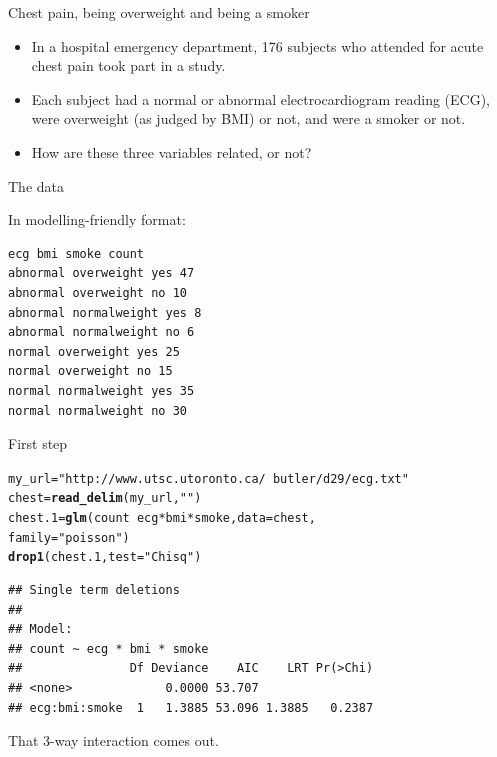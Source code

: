 \documentclass[unknownkeysallowed]{beamer}\usepackage[]{graphicx}\usepackage[]{color}
\makeatletter
\newcommand{\hlstr}[1]{\textcolor[rgb]{0.192,0.494,0.8}{#1}}%
\newcommand{\hlopt}[1]{\textcolor[rgb]{0,0,0}{#1}}%
\newcommand{\hlstd}[1]{\textcolor[rgb]{0.345,0.345,0.345}{#1}}%
\newcommand{\hlkwb}[1]{\textcolor[rgb]{0.69,0.353,0.396}{#1}}%
\newcommand{\hlkwc}[1]{\textcolor[rgb]{0.333,0.667,0.333}{#1}}%
\newcommand{\hlkwd}[1]{\textcolor[rgb]{0.737,0.353,0.396}{\textbf{#1}}}%
\newenvironment{kframe}{%
 \def\at@end@of@kframe{}%
 \ifinner\ifhmode%
  \def\at@end@of@kframe{\end{minipage}}%
  \begin{minipage}{\columnwidth}%
 \fi\fi%
 \def\FrameCommand##1{\hskip\@totalleftmargin \hskip-\fboxsep
 \colorbox{shadecolor}{##1}\hskip-\fboxsep
     \hskip-\linewidth \hskip-\@totalleftmargin \hskip\columnwidth}%
 \MakeFramed {\advance\hsize-\width
   \@totalleftmargin\z@ \linewidth\hsize
   \@setminipage}}%
 {\par\unskip\endMakeFramed%
 \at@end@of@kframe}
\newenvironment{knitrout}{}{} %
\makeatother
\begin{document}
\begin{frame}[fragile]{Chest pain, being overweight and being a smoker}
  
  \begin{itemize}
  \item In a hospital emergency department, 176 subjects who attended
    for acute chest pain took part in a study.
  \item Each subject had a
    normal or abnormal electrocardiogram reading (ECG), were
    overweight (as judged by BMI) or not, and were a smoker or
    not.
  \item How are these three variables related, or not?
  \end{itemize}
  
\end{frame}

\begin{frame}[fragile]{The data}
  
  In modelling-friendly format:
  
\begin{verbatim}
ecg bmi smoke count
abnormal overweight yes 47
abnormal overweight no 10
abnormal normalweight yes 8 
abnormal normalweight no 6
normal overweight yes 25 
normal overweight no 15 
normal normalweight yes 35
normal normalweight no 30
\end{verbatim}
  
\end{frame}

\begin{frame}[fragile]{First step}
  
\begin{knitrout}\small
{}\color{fgcolor}\begin{kframe}
\begin{alltt}
\hlstd{my_url}\hlkwb{=}\hlstr{"http://www.utsc.utoronto.ca/~butler/d29/ecg.txt"}
\hlstd{chest}\hlkwb{=}\hlkwd{read_delim}\hlstd{(my_url,}\hlstr{" "}\hlstd{)}
\hlstd{chest.1}\hlkwb{=}\hlkwd{glm}\hlstd{(count}\hlopt{~}\hlstd{ecg}\hlopt{*}\hlstd{bmi}\hlopt{*}\hlstd{smoke,}\hlkwc{data}\hlstd{=chest,}
            \hlkwc{family}\hlstd{=}\hlstr{"poisson"}\hlstd{)}
\hlkwd{drop1}\hlstd{(chest.1,}\hlkwc{test}\hlstd{=}\hlstr{"Chisq"}\hlstd{)}
\end{alltt}
\begin{verbatim}
## Single term deletions
## 
## Model:
## count ~ ecg * bmi * smoke
##               Df Deviance    AIC    LRT Pr(>Chi)
## <none>             0.0000 53.707                
## ecg:bmi:smoke  1   1.3885 53.096 1.3885   0.2387
\end{verbatim}
\end{kframe}
\end{knitrout}

That 3-way interaction comes out.
  
\end{frame}
\end{document}
